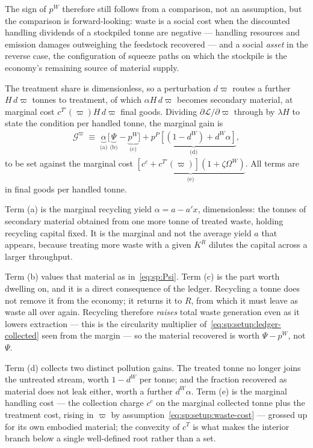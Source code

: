 The sign of $p^W$ therefore still follows from a comparison, not an assumption, but the comparison is forward-looking: waste is a social cost when the discounted handling dividends of a stockpiled tonne are negative --- handling resources and emission damages outweighing the feedstock recovered --- and a social \emph{asset} in the reverse case, the configuration of squeeze paths on which the stockpile is the economy's remaining source of material supply.

 The treatment share is dimensionless, so a perturbation $d\varpi$ routes a further $H\,d\varpi$ tonnes to treatment, of which $\alpha H\,d\varpi$ becomes secondary material, at marginal cost $c^{T\prime}\left(\varpi\right)H\,d\varpi$ final goods. Dividing $\partial\mathcal L/\partial\varpi$ through by $\lambda H$ to state the condition per handled tonne, the marginal gain is
\begin{align}
\mathcal G^\varpi \;\equiv\;
\underbrace{\alpha}_{\text{(a)}}\Big[\underbrace{\Psi}_{\text{(b)}}-\underbrace{p^W}_{\text{(c)}}\Big]
+\underbrace{p^P\left[\left(1-d^W\right)+d^W\alpha\right]}_{\text{(d)}} ,
\label{eq:sp:foc:varpi-gain}
\end{align}
to be set against the marginal cost $\underbrace{\left[c^c+c^{T\prime}\left(\varpi\right)\right]\left(1+\zeta\Omega^W\right)}_{\text{(e)}}$. All terms are in final goods per handled tonne.

Term (a) is the marginal recycling yield $\alpha=a-a'x$, dimensionless: the tonnes of secondary material obtained from one more tonne of treated waste, holding recycling capital fixed. It is the marginal and not the average yield $a$ that appears, because treating more waste with a given $K^R$ dilutes the capital across a larger throughput.

Term (b) values that material as in~\eqref{eq:sp:Psi}. Term (c) is the part worth dwelling on, and it is a direct consequence of the ledger. Recycling a tonne does not remove it from the economy; it returns it to $R$, from which it must leave as waste all over again. Recycling therefore \emph{raises} total waste generation even as it lowers extraction --- this is the circularity multiplier of~\eqref{eq:sp:setup:ledger-collected} seen from the margin --- so the material recovered is worth $\Psi-p^W$, not $\Psi$.

Term (d) collects two distinct pollution gains. The treated tonne no longer joins the untreated stream, worth $1-d^W$ per tonne; and the fraction recovered as material does not leak either, worth a further $d^W\alpha$. Term (e) is the marginal handling cost --- the collection charge $c^c$ on the marginal collected tonne plus the treatment cost, rising in $\varpi$ by assumption~\eqref{eq:sp:setup:waste-cost} --- grossed up for its own embodied material; the convexity of $c^T$ is what makes the interior branch below a single well-defined root rather than a set.

